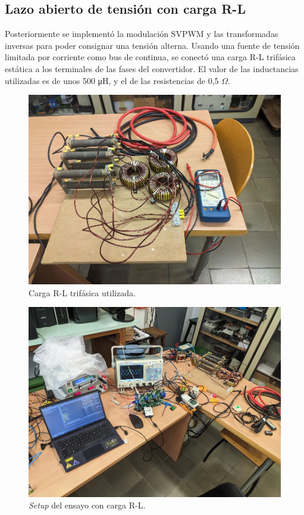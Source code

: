 
\subsection{Lazo abierto de tensión con carga R-L}

Posteriormente se implementó la modulación SVPWM y las transformadas inversas para poder consignar una tensión alterna. Usando una fuente de tensión limitada por corriente como bus de continua, se conectó una carga R-L trifásica estática a los terminales de las fases del convertidor. El valor de las inductancias utilizadas es de unos 500 \unit{\micro\henry}, y el de las resistencias de 0,5 $\Omega$.

\begin{figure}[H]
	\centering
	\includegraphics[width=0.7\linewidth]{fig/3RL-load}
	\caption{Carga R-L trifásica utilizada.}
\end{figure}

\begin{figure}[H]
	\centering
	\includegraphics[width=0.7\linewidth]{fig/3RL-setup}
	\caption{\textit{Setup} del ensayo con carga R-L.}
\end{figure}

